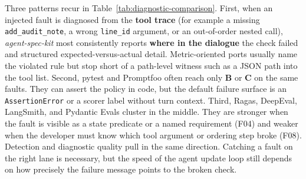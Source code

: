 Three patterns recur in Table~\ref{tab:diagnostic-comparison}. First, when an injected fault is diagnosed from the \textbf{tool trace} (for example a missing \texttt{add\_audit\_note}, a wrong \texttt{line\_id} argument, or an out-of-order nested call), \emph{agent-spec-kit} most consistently reports \textbf{where in the dialogue} the check failed and structured expected-versus-actual detail. Metric-oriented ports usually name the violated rule but stop short of a path-level witness such as a JSON path into the tool list. Second, pytest and Promptfoo often reach only \textbf{B} or \textbf{C} on the same faults. They can assert the policy in code, but the default failure surface is an \texttt{AssertionError} or a scorer label without turn context. Third, Ragas, DeepEval, LangSmith, and Pydantic Evals cluster in the middle. They are stronger when the fault is visible as a state predicate or a named requirement (F04) and weaker when the developer must know which tool argument or ordering step broke (F08). Detection and diagnostic quality pull in the same direction. Catching a fault on the right lane is necessary, but the speed of the agent update loop still depends on how precisely the failure message points to the broken check.
